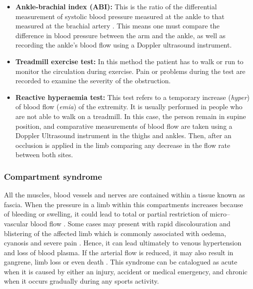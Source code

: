 \begin{itemize}
    \item \textbf{Ankle-brachial index (ABI):} This is the ratio of the differential measurement of systolic blood pressure measured at the ankle to that measured at the brachial artery \cite{winsor1950influence}. This means one must compare the difference in blood pressure between the arm and the ankle, as well as recording the ankle's blood flow using a Doppler ultrasound instrument.  
    \item \textbf{Treadmill exercise test: }In this method the patient has to walk or run to monitor the circulation during exercise. Pain or problems during the test are recorded to examine the severity of the obstruction.
    \item \textbf{Reactive hyperaemia test:} This test refers to a temporary increase (\textit{hyper}) of blood flow (\textit{emia}) of the extremity. It is usually performed in people who are not able to walk on a treadmill. In this case, the person remain in supine position, and comparative measurements of blood flow are taken using a Doppler Ultrasound instrument in the thighs and ankles. Then, after an occlusion is applied in the limb comparing any decrease in the flow rate between both sites. 
\end{itemize}

\subsubsection{Compartment syndrome}
\label{section literature 2.2}                                                                                                                                                                                                                                                                                                                                                                                                                                                                                                                                                                                                                     
All the muscles, blood vessels and nerves are contained within a tissue known as fascia. When the pressure in a limb within this compartments increases because of bleeding or swelling, it could lead to total or partial restriction of micro–vascular blood flow \cite{songer2001tissue}. Some cases may present with rapid discolouration and blistering of the affected limb which is commonly associated with oedema, cyanosis and severe pain \cite{chhabra2013compartment}. Hence, it can lead ultimately to venous hypertension and loss of blood plasma. If the arterial flow is reduced, it may also result in gangrene, limb loss or even death \cite{lamborn2014compartment}. This syndrome can be catalogued as acute when it is caused by either an injury, accident or medical emergency, and chronic when it occurs gradually during any sports activity.

